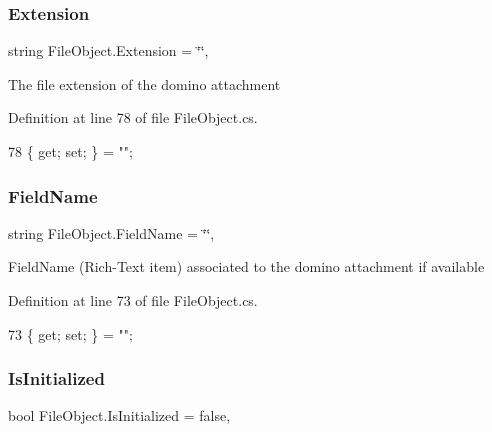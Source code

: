 \subsubsection{\texorpdfstring{Extension}{Extension}}
{\footnotesize\ttfamily string File\+Object.\+Extension = \char`\"{}\char`\"{}\hspace{0.3cm}{\ttfamily [get]}, {\ttfamily [set]}}



The file extension of the domino attachment 



Definition at line 78 of file File\+Object.\+cs.


\begin{DoxyCode}
78 \{ \textcolor{keyword}{get}; \textcolor{keyword}{set}; \} = \textcolor{stringliteral}{""};
\end{DoxyCode}
\mbox{\label{class_file_object_a26fa0ac628fee2387b7f89c78f93842e}} 
\subsubsection{\texorpdfstring{Field\+Name}{FieldName}}
{\footnotesize\ttfamily string File\+Object.\+Field\+Name = \char`\"{}\char`\"{}\hspace{0.3cm}{\ttfamily [get]}, {\ttfamily [set]}}



Field\+Name (Rich-\/\+Text item) associated to the domino attachment if available 



Definition at line 73 of file File\+Object.\+cs.


\begin{DoxyCode}
73 \{ \textcolor{keyword}{get}; \textcolor{keyword}{set}; \} = \textcolor{stringliteral}{""};
\end{DoxyCode}
\mbox{\label{class_file_object_a36ff6c07d0662885402bfe7d98cf2988}} 
\subsubsection{\texorpdfstring{Is\+Initialized}{IsInitialized}}
{\footnotesize\ttfamily bool File\+Object.\+Is\+Initialized = false\hspace{0.3cm}{\ttfamily [get]}, {\ttfamily [set]}}



